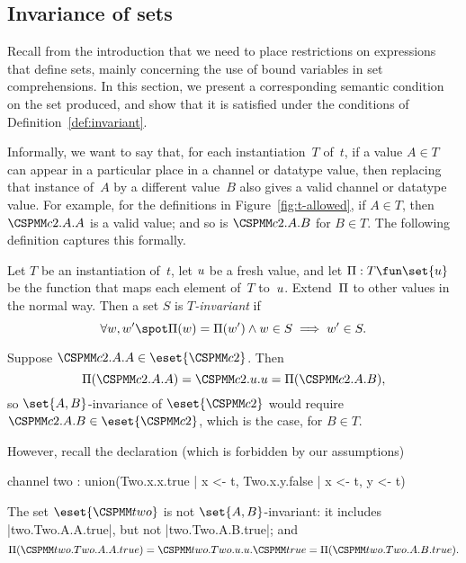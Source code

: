 
\subsection{Invariance of sets}

Recall from the introduction that we need to place restrictions on expressions
that define sets, mainly concerning the use of bound variables in set
comprehensions.  In this section, we present a corresponding semantic
condition on the set produced, and show that it is satisfied under the
conditions of Definition~\ref{def:invariant}.

Informally, we want to say that, for each instantiation~$T$ of~$t$, if a value
$A \in T$ can appear in a particular place in a channel or datatype value,
then replacing that instance of~$A$ by a different value~$B$ also gives a
valid channel or datatype value.  For example, for the definitions in
Figure~\ref{fig:t-allowed}, if $A \in T$, then $\M{c2}.A.A$ is a valid value;
and so is $\M{c2}.A.B$ for $B \in T$.  The following definition captures this
formally.
%
\begin{definition}
Let $T$ be an instantiation of~$t$, let $u$ be a fresh value, and let
$\unitf : T \fun \set{\unit}$ be the function that maps each element of~$T$
to~$u$. Extend~$\Pi$ to other values in the normal way.  Then a set $S$
is \emph{$T$-invariant} if
\[
\forall w, w' \spot
  \unitf(w) = \unitf(w') \land w \in S  \implies w' \in S.
\]
\end{definition}


\begin{example}
Suppose $\M{c2}.A.A \in \eset{\M{c2}}$.  Then 
\[
\unitf(\M{c2}.A.A) = \M{c2}.\unit.\unit = \unitf(\M{c2}.A.B),
\]
so $\set{A,B}$-invariance of $\eset{\M{c2}}$ would require $\M{c2}.A.B \in
\eset{\M{c2}}$, which is the case, for $B \in T$.

However, recall the declaration (which is forbidden by our assumptions)
%
\begin{cspm}
channel two : union({Two.x.x.true | x <- t}, {Two.x.y.false | x <- t, y <- t})
\end{cspm}
%
The set $\eset{\M{two}}$ is not $\set{A,B}$-invariant: it includes
|two.Two.A.A.true|, but not |two.Two.A.B.true|; and
\[
\unitf(\M{two.Two.A.A.true}) = \M{two.Two}.u.u.\M{true} =
   \unitf(\M{two.Two.A.B.true}).
\]
\end{example}

